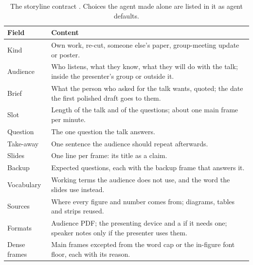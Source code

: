\begin{table}[H]
  \small
  \begin{tabularx}{\textwidth}{L{0.2\textwidth}Y}
    \toprule
    Field & Content \\
    \midrule
    Kind & Own work, re-cut, someone else's paper, group-meeting update or poster. \\
    Audience & Who listens, what they know, what they will do with the talk; inside the
    presenter's group or outside it. \\
    Brief & What the person who asked for the talk wants, quoted; the date the first
    polished draft goes to them. \\
    Slot & Length of the talk and of the questions; about one main frame per minute. \\
    Question & The one question the talk answers. \\
    Take-away & One sentence the audience should repeat afterwards. \\
    Slides & One line per frame: its title as a claim. \\
    Backup & Expected questions, each with the backup frame that answers it. \\
    Vocabulary & Working terms the audience does not use, and the word the slides use
    instead. \\
    Sources & Where every figure and number comes from; diagrams, tables and strips reused. \\
    Formats & Audience PDF; the presenting device and a  if it needs one;
    speaker notes only if the presenter uses them. \\
    Dense frames & Main frames excepted from the word cap or the in-figure font floor,
    each with its reason. \\
    \bottomrule
  \end{tabularx}
  \caption{The storyline contract \cite[The storyline contract]{skill:deck-production}.
    Choices the agent made alone are listed in it as agent defaults.}
  \label{tab:talks-storyline}
\end{table}

